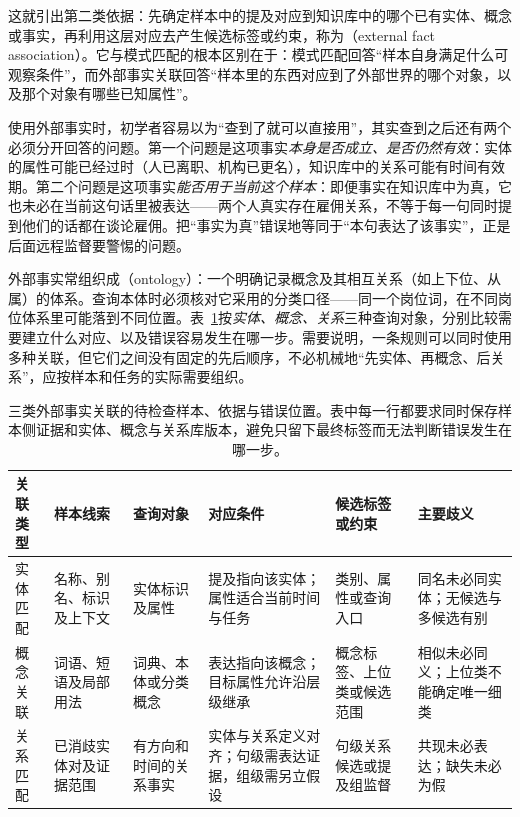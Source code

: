 这就引出第二类依据：先确定样本中的提及对应到知识库中的哪个已有实体、概念或事实，再利用这层对应去产生候选标签或约束，称为（external fact association）。它与模式匹配的根本区别在于：模式匹配回答“样本自身满足什么可观察条件”，而外部事实关联回答“样本里的东西对应到了外部世界的哪个对象，以及那个对象有哪些已知属性”。

使用外部事实时，初学者容易以为“查到了就可以直接用”，其实查到之后还有两个必须分开回答的问题。第一个问题是这项事实\emph{本身是否成立、是否仍然有效}：实体的属性可能已经过时（人已离职、机构已更名），知识库中的关系可能有时间有效期。第二个问题是这项事实\emph{能否用于当前这个样本}：即便事实在知识库中为真，它也未必在当前这句话里被表达——两个人真实存在雇佣关系，不等于每一句同时提到他们的话都在谈论雇佣。把“事实为真”错误地等同于“本句表达了该事实”，正是后面远程监督要警惕的问题。

外部事实常组织成（ontology）：一个明确记录概念及其相互关系（如上下位、从属）的体系。查询本体时必须核对它采用的分类口径——同一个岗位词，在不同岗位体系里可能落到不同位置。表~\ref{tab:rule-based-knowledge-acquisition-association}按\emph{实体、概念、关系}三种查询对象，分别比较需要建立什么对应、以及错误容易发生在哪一步。需要说明，一条规则可以同时使用多种关联，但它们之间没有固定的先后顺序，不必机械地“先实体、再概念、后关系”，应按样本和任务的实际需要组织。

\begin{table}[htbp]
  \centering
  \begingroup
  \setlength{\tabcolsep}{2.5pt}
  \setlength{\parindent}{0pt}
  \setlength{\RaggedRightParindent}{0pt}
  \renewcommand{\arraystretch}{1.12}
  \begin{tabularx}{\linewidth}{>{\raggedright\arraybackslash}p{17mm}>{\raggedright\arraybackslash}p{25mm}>{\raggedright\arraybackslash}p{26mm}>{\raggedright\arraybackslash}p{30mm}>{\raggedright\arraybackslash}p{29mm}>{\raggedright\arraybackslash}X}
    \toprule
    关联类型 & 样本线索 & 查询对象 & 对应条件 & 候选标签或约束 & 主要歧义 \\
    \midrule
    实体匹配 & 名称、别名、标识及上下文 & 实体标识及属性 & 提及指向该实体；属性适合当前时间与任务 & 类别、属性或查询入口 & 同名未必同实体；无候选与多候选有别 \\
    概念关联 & 词语、短语及局部用法 & 词典、本体或分类概念 & 表达指向该概念；目标属性允许沿层级继承 & 概念标签、上位类或候选范围 & 相似未必同义；上位类不能确定唯一细类 \\
    关系匹配 & 已消歧实体对及证据范围 & 有方向和时间的关系事实 & 实体与关系定义对齐；句级需表达证据，组级需另立假设 & 句级关系候选或提及组监督 & 共现未必表达；缺失未必为假 \\
    \bottomrule
  \end{tabularx}
  \endgroup
  \caption{三类外部事实关联的待检查样本、依据与错误位置。表中每一行都要求同时保存样本侧证据和实体、概念与关系库版本，避免只留下最终标签而无法判断错误发生在哪一步。}
  \label{tab:rule-based-knowledge-acquisition-association}
\end{table}

